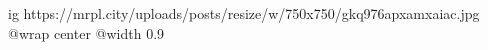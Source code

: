  
 
 
 
 

\ifcmt
  ig https://mrpl.city/uploads/posts/resize/w/750x750/gkq976apxamxaiac.jpg
  @wrap center
  @width 0.9
\fi
